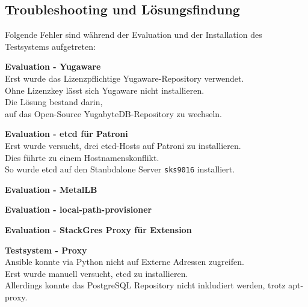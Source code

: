 
\begin{flushleft}
    \section{Troubleshooting und Lösungsfindung}
    Folgende Fehler sind während der Evaluation und der Installation des Testsystems aufgetreten:\\
    \begin{description}
        \item \textbf{Evaluation - Yugaware}\hfill \\Erst wurde das Lizenzpflichtige Yugaware-Repository verwendet.\\Ohne Lizenzkey lässt sich Yugaware nicht installieren.\\Die Lösung bestand darin,\\auf das Open-Source YugabyteDB-Repository zu wechseln.
        \item \textbf{Evaluation - etcd für Patroni}\hfill \\Erst wurde versucht, drei etcd-Hosts auf Patroni zu installieren.\\Dies führte zu einem Hostnamenskonflikt.\\So wurde etcd auf den Stanbdalone Server \texttt{sks9016} installiert.
        \item \textbf{Evaluation - MetalLB}\hfill \\
        \item \textbf{Evaluation - local-path-provisioner}\hfill \\
        \item \textbf{Evaluation - StackGres Proxy für Extension}\hfill \\
        \item \textbf{Testsystem - Proxy}\hfill \\Ansible konnte via Python nicht auf Externe Adressen zugreifen.\\Erst wurde manuell versucht, etcd zu installieren.\\Allerdings konnte das PostgreSQL Repository nicht inkludiert werden, trotz apt-proxy.
    \end{description}
\end{flushleft}